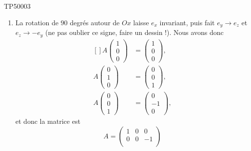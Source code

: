 \begin{corrige}{TP50003}
\begin{enumerate}
		\item
		      La rotation de $90$ degrés autour de $Ox$ laisse $e_x$ invariant, puis fait $e_y\to e_z$ et $e_z\to -e_y$ (ne pas oublier ce signe, faire un dessin !). Nous avons donc
		      \begin{equation}
			      \begin{aligned}[]
				      A\begin{pmatrix}
					       1 \\
					       0 \\
					       0
				       \end{pmatrix} & =\begin{pmatrix}
					                        1 \\
					                        0 \\
					                        0
				                        \end{pmatrix}, \\
				      A\begin{pmatrix}
					       0 \\
					       1 \\
					       0
				       \end{pmatrix} & =\begin{pmatrix}
					                        0 \\
					                        0 \\
					                        1
				                        \end{pmatrix}, \\
				      A\begin{pmatrix}
					       0 \\
					       0 \\
					       1
				       \end{pmatrix} & =\begin{pmatrix}
					                        0  \\
					                        -1 \\
					                        0
				                        \end{pmatrix},
			      \end{aligned}
		      \end{equation}
		      et donc la matrice est
		      \begin{equation}
			      A=\begin{pmatrix}
				      1 & 0 & 0  \\
				      0 & 0 & -1 \\

\end{pmatrix}
\end{equation}
\end{enumerate}
\end{corrige}
